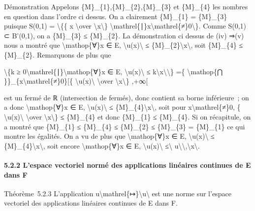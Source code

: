 \documentclass[]{article}
\begin{document}
Démonstration Appelons \{M\}\_\{1\},\{M\}\_\{2\},\{M\}\_\{3\} et
\{M\}\_\{4\} les nombres en question dans l'ordre ci dessus. On a
clairement \{M\}\_\{1\} = \{M\}\_\{3\} puisque S(0,1) =
\textbackslash{}\{\{ x \textbackslash{}over
\textbackslash{}\textbar{}x\textbackslash{}\textbar{}\}
\textbackslash{}mathrel\{∣\}x\textbackslash{}mathrel\{≠\}0\textbackslash{}\}.
Comme S(0,1) ⊂ B'(0,1), on a \{M\}\_\{3\} ≤ \{M\}\_\{2\}. La
démonstration ci dessus de (iv) ⇒(v) nous a montré que
\textbackslash{}mathop\{∀\}x ∈ E,
\textbackslash{}\textbar{}u(x)\textbackslash{}\textbar{} ≤
\{M\}\_\{2\}\textbackslash{}\textbar{}x\textbackslash{}\textbar{}, soit
\{M\}\_\{4\} ≤ \{M\}\_\{2\}. Remarquons de plus que

\textbackslash{}\{k ≥
0\textbackslash{}mathrel\{∣\}\textbackslash{}mathop\{∀\}x ∈ E,
\textbackslash{}\textbar{}u(x)\textbackslash{}\textbar{} ≤
k\textbackslash{}\textbar{}x\textbackslash{}\textbar{}\textbackslash{}\}
=\{ \textbackslash{}mathop\{⋂
\}\}\_\{x\textbackslash{}mathrel\{≠\}0\}{[}\{
\textbackslash{}\textbar{}u(x)\textbackslash{}\textbar{}
\textbackslash{}over
\textbackslash{}\textbar{}x\textbackslash{}\textbar{}\} ,+∞{[}

est un fermé de ℝ (intersection de fermés), donc contient sa borne
inférieure~; on a donc \textbackslash{}mathop\{∀\}x ∈ E,
\textbackslash{}\textbar{}u(x)\textbackslash{}\textbar{} ≤
\{M\}\_\{4\}\textbackslash{}\textbar{}x\textbackslash{}\textbar{}, soit
pour x\textbackslash{}mathrel\{≠\}0, \{
\textbackslash{}\textbar{}u(x)\textbackslash{}\textbar{}
\textbackslash{}over
\textbackslash{}\textbar{}x\textbackslash{}\textbar{}\} ≤ \{M\}\_\{4\}
et donc \{M\}\_\{1\} ≤ \{M\}\_\{4\}. Si on récapitule, on a montré que
\{M\}\_\{1\} ≤ \{M\}\_\{4\} ≤ \{M\}\_\{2\} ≤ \{M\}\_\{3\} = \{M\}\_\{1\}
ce qui montre les égalités. On a vu de plus que
\textbackslash{}mathop\{∀\}x ∈ E,
\textbackslash{}\textbar{}u(x)\textbackslash{}\textbar{} ≤
\{M\}\_\{4\}\textbackslash{}\textbar{}x\textbackslash{}\textbar{}, soit
encore \textbackslash{}mathop\{∀\}x ∈ E,
\textbackslash{}\textbar{}u(x)\textbackslash{}\textbar{}
≤\textbackslash{}\textbar{}
u\textbackslash{}\textbar{}\textbackslash{},\textbackslash{}\textbar{}x\textbackslash{}\textbar{}.

\paragraph{5.2.2 L'espace vectoriel normé des applications linéaires
continues de E dans F}

Théorème~5.2.3 L'application
u\textbackslash{}mathrel\{↦\}\textbackslash{}\textbar{}u\textbackslash{}\textbar{}
est une norme sur l'espace vectoriel des applications linéaires
continues de E dans F.
\end{document}
